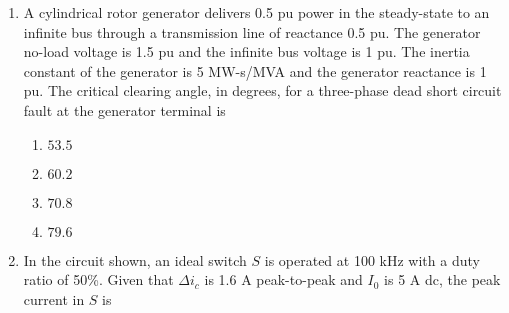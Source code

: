 \documentclass[journal]{IEEEtran}
\begin{document}
\begin{enumerate}
    \begin{multicols}{4}
        \begin{enumerate}
            \item $0.2$ pu
            \item $0.268$ pu
            \item $0.312$ pu
            \item $0.4$ pu
        \end{enumerate}
    \end{multicols}

    \item A cylindrical rotor generator delivers 0.5 pu power in the steady-state to an infinite bus through a transmission line of reactance 0.5 pu. The generator no-load voltage is 1.5 pu and the infinite bus voltage is 1 pu. The inertia constant of the generator is 5 MW-s/MVA and the generator reactance is 1 pu. The critical clearing angle, in degrees, for a three-phase dead short circuit fault at the generator terminal is

    \begin{multicols}{4}
        \begin{enumerate}
            \item $53.5$
            \item $60.2$
            \item $70.8$
            \item $79.6$
        \end{enumerate}
    \end{multicols}

    \item In the circuit shown, an ideal switch $S$ is operated at 100 kHz with a duty ratio of 50\%. Given that $\Delta i_c$ is 1.6 A peak-to-peak and $I_0$ is 5 A dc, the peak current in $S$ is


\end{enumerate}
\end{document}
